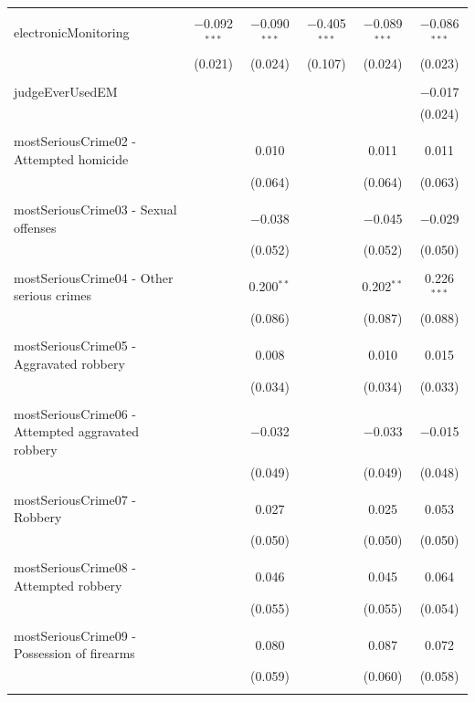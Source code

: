 \documentclass[a4paper,12pt]{article}
\begin{document}
\begin{table}[!htbp]
{\begin{tabular}{@{\extracolsep{5pt}}lccccc}
\hline \\[-1.8ex] 
 electronicMonitoring & $-$0.092$^{***}$ & $-$0.090$^{***}$ & $-$0.405$^{***}$ & $-$0.089$^{***}$ & $-$0.086$^{***}$ \\ 
  & (0.021) & (0.024) & (0.107) & (0.024) & (0.023) \\ 
  & & & & & \\ 
 judgeEverUsedEM &  &  &  &  & $-$0.017 \\ 
  &  &  &  &  & (0.024) \\ 
  & & & & & \\ 
 mostSeriousCrime02 - Attempted homicide &  & 0.010 &  & 0.011 & 0.011 \\ 
  &  & (0.064) &  & (0.064) & (0.063) \\ 
  & & & & & \\ 
 mostSeriousCrime03 - Sexual offenses &  & $-$0.038 &  & $-$0.045 & $-$0.029 \\ 
  &  & (0.052) &  & (0.052) & (0.050) \\ 
  & & & & & \\ 
 mostSeriousCrime04 - Other serious crimes &  & 0.200$^{**}$ &  & 0.202$^{**}$ & 0.226$^{***}$ \\ 
  &  & (0.086) &  & (0.087) & (0.088) \\ 
  & & & & & \\ 
 mostSeriousCrime05 - Aggravated robbery &  & 0.008 &  & 0.010 & 0.015 \\ 
  &  & (0.034) &  & (0.034) & (0.033) \\ 
  & & & & & \\ 
 mostSeriousCrime06 - Attempted aggravated robbery &  & $-$0.032 &  & $-$0.033 & $-$0.015 \\ 
  &  & (0.049) &  & (0.049) & (0.048) \\ 
  & & & & & \\ 
 mostSeriousCrime07 - Robbery &  & 0.027 &  & 0.025 & 0.053 \\ 
  &  & (0.050) &  & (0.050) & (0.050) \\ 
  & & & & & \\ 
 mostSeriousCrime08 - Attempted robbery &  & 0.046 &  & 0.045 & 0.064 \\ 
  &  & (0.055) &  & (0.055) & (0.054) \\ 
  & & & & & \\ 
 mostSeriousCrime09 - Possession of firearms &  & 0.080 &  & 0.087 & 0.072 \\ 
  &  & (0.059) &  & (0.060) & (0.058) \\ 
  & & & & & \\ 

\end{tabular}}
\end{table}
\end{document}
